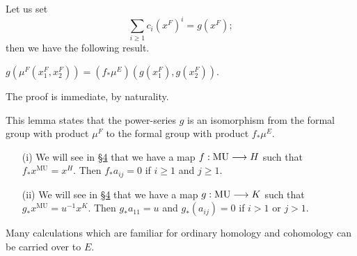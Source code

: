 \documentclass[../main]{subfiles}
\begin{document}
Let us set $$\sum_{i \ge 1} c_i (x^F)^i = g(x^F);$$ then we have the following result. 

\begin{lemma}
\label{lem:p2c02.13}
$g(\mu^F(x_1^F, x_2^F)) = (f_\ast \mu^E) (g(x_1^F), g(x_2^F))$.
\end{lemma}

The proof is immediate, by naturality. 

This lemma states that the power-series $g$ is an isomorphism from the formal group with product $\mu^F$ to the formal group with product $f_\ast \mu^E$. 

\begin{examples}
\begin{enumerate}
    \item[(i)] We will see in \hyperref[sec:p2c4]{\S 4} that we have a map $f : \mathrm{MU} \overset{}{\longrightarrow} H$ such that $f_\ast x^{\mathrm{MU}} = x^H$. Then $f_\ast a_{ij} = 0$ if $i \ge 1$ and $j \ge 1$.
    \item[(ii)] We will see in \hyperref[sec:p2c4]{\S 4} that we have a map $g : \mathrm{MU} \overset{}{\longrightarrow} K$ such that $g_\ast x^{\mathrm{MU}} = u^{-1} x^K$. Then $g_\ast a_{11} = u$ and $g_\ast(a_{ij}) = 0$ if $i > 1$ or $j > 1$.
\end{enumerate}
\end{examples}

Many calculations which are familiar for ordinary homology and cohomology can be carried over to $E$. 
\end{document}
